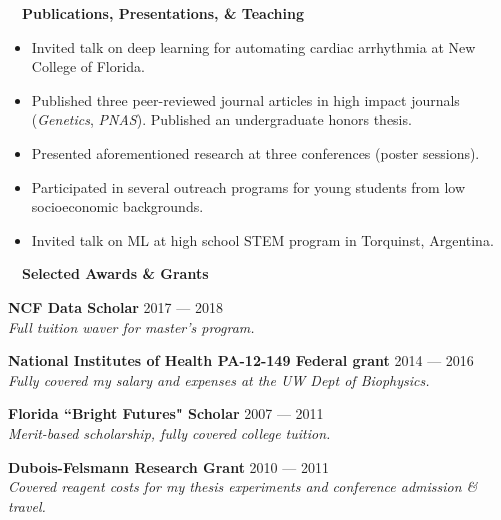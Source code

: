 \documentclass[a4paper,12pt]{article}
\newcommand{\resheading}[1]{{\hspace{-9pt} \colorbox{mygrey}{\begin{minipage}{\textwidth}{\textmd{~~\large \textbf{#1} \vphantom{p\^{E}}}}\end{minipage}}\vspace{6pt}} }
\newcommand{\ressubheading}[4]{{\begin{minipage}{\textwidth}
                                    \textbf{#1} \hfill #2 \\
                                    \textit{#3} \hfill #4 \\
\end{minipage}}}
\begin{document}
    \resheading{Publications, Presentations, \& Teaching}
    \vspace{-19pt} \begin{itemize}
                       \item Invited talk on deep learning for automating cardiac arrhythmia at New College of Florida.
                       \item Published three peer-reviewed journal articles in high impact journals (\textit{Genetics}, \textit{PNAS}).
                       Published an undergraduate honors thesis.
                       \item Presented aforementioned research at three conferences (poster sessions).
                       \item Participated in several outreach programs for young students from low socioeconomic backgrounds.
                       \item Invited talk on ML at high school STEM program in Torquinst, Argentina.
    \end{itemize}


    \resheading{Selected Awards \& Grants}
    \ressubheading{NCF Data Scholar}{2017 --- 2018}{Full tuition waver for master's program.}{}

    \ressubheading{National Institutes of Health PA-12-149 Federal grant}{2014 --- 2016}{Fully covered my salary and expenses at the UW Dept of Biophysics.}{}


    \ressubheading{Florida ``Bright Futures" Scholar}{2007 --- 2011}{Merit-based scholarship, fully covered college tuition.}{}

    \ressubheading{Dubois-Felsmann Research Grant}{2010 --- 2011}{Covered reagent costs for my thesis experiments and conference admission     \& travel.}{}
\end{document}
